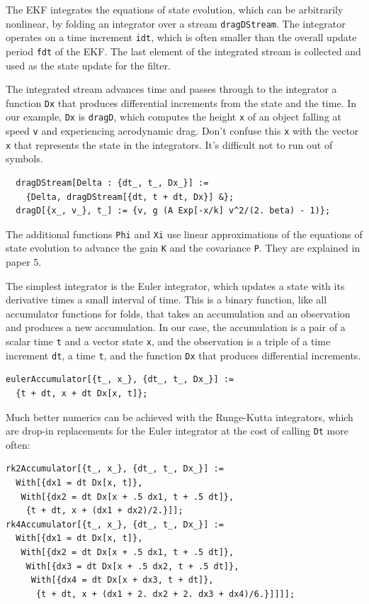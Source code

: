 \documentclass[10pt,oneside,x11names]{article}
\begin{document}
\noindent The EKF integrates the equations of state evolution, which can be
arbitrarily nonlinear, by folding an integrator over a stream \texttt{dragDStream}. The
integrator operates on a time increment \texttt{idt}, which is often smaller than the
overall update period \texttt{fdt} of the EKF. The last element of the integrated
stream is collected and used as the state update for the filter.

The integrated stream advances time and passes through to the integrator a
function \texttt{Dx} that produces differential increments from the state and the time.
In our example, \texttt{Dx} is \texttt{dragD}, which computes the height \texttt{x} of an object
falling at speed \texttt{v} and experiencing aerodynamic drag. Don't confuse this \texttt{x}
with the vector \texttt{x} that represents the state in the integrators. It's difficult
not to run out of symbols.

\begin{verbatim}
  dragDStream[Delta : {dt_, t_, Dx_}] :=
    {Delta, dragDStream[{dt, t + dt, Dx}] &};
  dragD[{x_, v_}, t_] := {v, g (A Exp[-x/k] v^2/(2. beta) - 1)};
\end{verbatim}

The additional functions \texttt{Phi} and \texttt{Xi} use linear approximations of the
equations of state evolution to advance the gain \texttt{K} and the covariance \texttt{P}.
They are explained in paper 5.

The simplest integrator is the Euler integrator, which updates a state with its
derivative times a small interval of time. This is a binary function, like all
accumulator functions for folds, that takes an accumulation and an observation
and produces a new accumulation. In our case, the accumulation is a pair of a
scalar time \texttt{t} and a vector state \texttt{x}, and the observation is a triple of a
time increment \texttt{dt}, a time \texttt{t}, and the function \texttt{Dx} that produces
differential increments.

\begin{verbatim}
eulerAccumulator[{t_, x_}, {dt_, t_, Dx_}] :=
  {t + dt, x + dt Dx[x, t]};
\end{verbatim}

Much better numerics can be achieved with the Runge-Kutta integrators, which are
drop-in replacements for the Euler integrator at the cost of calling \texttt{Dt} more often:

\begin{verbatim}
rk2Accumulator[{t_, x_}, {dt_, t_, Dx_}] :=
  With[{dx1 = dt Dx[x, t]},
   With[{dx2 = dt Dx[x + .5 dx1, t + .5 dt]},
    {t + dt, x + (dx1 + dx2)/2.}]];
rk4Accumulator[{t_, x_}, {dt_, t_, Dx_}] :=
  With[{dx1 = dt Dx[x, t]},
   With[{dx2 = dt Dx[x + .5 dx1, t + .5 dt]},
    With[{dx3 = dt Dx[x + .5 dx2, t + .5 dt]},
     With[{dx4 = dt Dx[x + dx3, t + dt]},
      {t + dt, x + (dx1 + 2. dx2 + 2. dx3 + dx4)/6.}]]]];
\end{verbatim}
\end{document}
